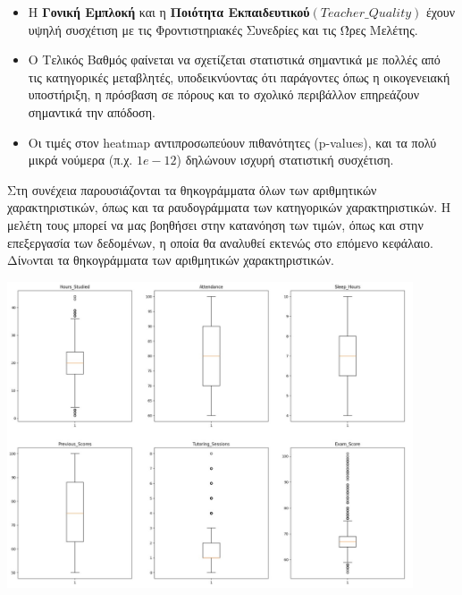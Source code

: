 \documentclass[12pt]{article}
\begin{document}
\begin{itemize}
    \item Η \textbf{Γονική Εμπλοκή } και η \textbf{Ποιότητα Εκπαιδευτικού$(Teacher\_Quality)$} έχουν υψηλή συσχέτιση με τις Φροντιστηριακές Συνεδρίες και τις Ώρες Μελέτης.
    \item Ο Τελικός Βαθμός φαίνεται να σχετίζεται στατιστικά σημαντικά με πολλές από τις κατηγορικές μεταβλητές, υποδεικνύοντας ότι παράγοντες όπως η οικογενειακή υποστήριξη, η πρόσβαση σε πόρους και το σχολικό περιβάλλον επηρεάζουν σημαντικά την απόδοση.
    \item Οι τιμές στον heatmap αντιπροσωπεύουν πιθανότητες (p-values), και τα πολύ μικρά νούμερα (π.χ. $1e-12$) δηλώνουν ισχυρή στατιστική συσχέτιση.
\end{itemize}

Στη συνέχεια παρουσιάζονται τα θηκογράμματα όλων των αριθμητικών χαρακτηριστικών, όπως και τα ραυδογράμματα των κατηγορικών χαρακτηριστικών. Η μελέτη τους μπορεί να μας βοηθήσει στην κατανόηση των τιμών, όπως και στην επεξεργασία των δεδομένων, η οποία θα αναλυθεί εκτενώς στο επόμενο κεφάλαιο. \\


\noindent Δίνoνται τα θηκογράμματα των αριθμητικών χαρακτηριστικών.\\

\begin{center}
    \includegraphics[width=0.9\textwidth]{./images/icon13.jpg}
    
\end{center}
\end{document}
